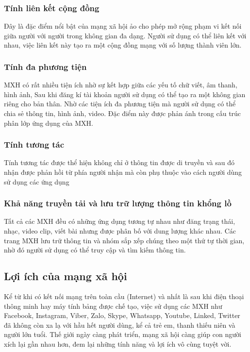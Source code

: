 		\subsubsection{Tính liên kết cộng đồng}
		Đây là đặc điểm nổi bật của mạng xã hội ảo cho phép mở rộng phạm vi kết nối giữa người với người trong không gian đa dạng. Người sử dụng có thể liên kết với nhau, việc liên kết này tạo ra một cộng đồng mạng với số lượng thành viên lớn.
		\subsubsection{Tính đa phương tiện}
		MXH có rất nhiều tiện ích nhờ sự kết hợp giữa các yếu tố chữ viết, âm thanh, hình ảnh, Sau khi đăng kí tài khoản người sử dụng có thể tạo ra một không gian riêng cho bản thân. Nhờ các tiện ích đa phương tiện mà người sử dụng có thể chia sẻ thông tin, hình ảnh, video. Đặc điểm này được phản ánh trong cấu trúc phân lớp ứng dụng của MXH.
		\subsubsection{Tính tương tác}
		Tính tương tác được thể hiện không chỉ ở thông tin được di truyền và sau đó nhận được phản hồi từ phía người nhận mà còn phụ thuộc vào cách người dùng sử dụng các ứng dụng
		\subsubsection{Khả năng truyền tải và lưu trữ lượng thông tin khổng lồ}
		Tất cả các MXH đều có những ứng dụng tương tự nhau như đăng trạng thái, nhạc, video clip, viết bài nhưng được phân bố với dung lượng khác nhau. Các trang MXH lưu trữ thông tin và nhóm sắp xếp chúng theo một thứ tự thời gian, nhờ đó người sử dụng có thể truy cập và tìm kiếm thông tin.
	\subsection{Lợi ích của mạng xã hội}
	Kể từ khi có kết nối mạng trên toàn cầu (Internet) và nhất là sau khi điện thoại thông minh hay máy tính bảng được chế tạo, việc sử dụng các MXH như Facebook, Instagram, Viber, Zalo, Skype, Whatsapp, Youtube, Linked, Twitter đã không còn xa lạ với hầu hết người dùng, kể cả trẻ em, thanh thiếu niên và người lớn tuổi. Thế giới ngày càng phát triển, mạng xã hội càng giúp con người xích lại gần nhau hơn, đem lại những tính năng và lợi ích vô cùng tuyệt vời.
